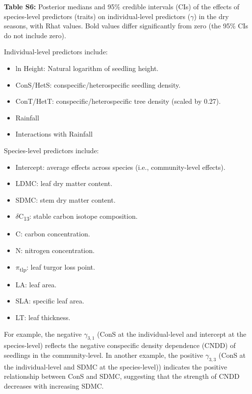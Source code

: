 \documentclass[
  12pt,
  letterpaper,
  DIV=11,
  numbers=noendperiod]{scrartcl}
\providecommand{\tightlist}{%
  \setlength{\itemsep}{0pt}\setlength{\parskip}{0pt}}\usepackage{longtable,booktabs,array}
\begin{document}
\newpage

\textbf{Table S6:} Posterior medians and 95\% credible intervals (CIs)
of the effects of species-level predictors (traits) on individual-level
predictors (\(\gamma\)) in the dry seasons, with Rhat values. Bold
values differ significantly from zero (the 95\% CIs do not include
zero).

Individual-level predictors include:

\begin{itemize}
\tightlist
\item
  ln Height: Natural logarithm of seedling height.
\item
  ConS/HetS: conspecific/heterospecific seedling density.
\item
  ConT/HetT: conspecific/heterospecific tree density (scaled by 0.27).
\item
  Rainfall
\item
  Interactions with Rainfall
\end{itemize}

Species-level predictors include:

\begin{itemize}
\tightlist
\item
  Intercept: average effects across species (i.e., community-level
  effects).
\item
  LDMC: leaf dry matter content.
\item
  SDMC: stem dry matter content.
\item
  \(\delta\)C\textsubscript{13}: stable carbon isotope composition.
\item
  C: carbon concentration.
\item
  N: nitrogen concentration.
\item
  \(\pi\)\textsubscript{tlp}: leaf turgor loss point.
\item
  LA: leaf area.
\item
  SLA: specific leaf area.
\item
  LT: leaf thickness.
\end{itemize}

For example, the negative \(\gamma_{3,1}\) (ConS at the individual-level
and intercept at the species-level) reflects the negative conspecific
density dependence (CNDD) of seedlings in the community-level. In
another example, the positive \(\gamma_{3,3}\) (ConS at the
individual-level and SDMC at the species-level)) indicates the positive
relationship between ConS and SDMC, suggesting that the strength of CNDD
decreases with increasing SDMC.
\end{document}
